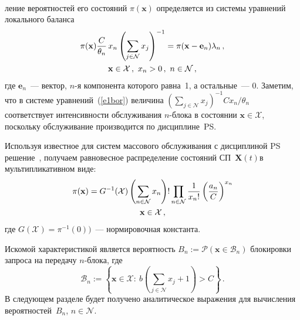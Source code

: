  \begin{figure}[b]  %
\begin{center}
\mbox{%
\epsfxsize=157.777mm
}
\end{center}
\vspace*{-9pt}
\end{figure}

  
\begin{multicols}{2}

\noindent
ление вероятностей его 
состояний $\pi (\mathbf{x})$ определяется из системы уравнений локального 
баланса
\begin{multline}
\pi (\mathbf{x} ) \displaystyle\frac{\displaystyle C\mathstrut}{\displaystyle \theta_n\mathstrut}\, x_n \left ( \sum\limits_{j\in {\mathcal N}}x_j\right )^{-1} 
=\pi (\mathbf{x} -\mathbf{e}_n)\lambda_n\,,\\
\mathbf{x}\in {\mathcal X}\,,\ x_n >0\,, \  n\in {\mathcal N}\,,
\label{e1bor}
\end{multline}
    где $\mathbf{e}_n$~--- вектор, $n$-я компонента которого равна~1, а 
остальные~--- 0. Заметим, что в сис\-те\-ме урав\-не\-ний~(\ref{e1bor}) величина $(\sum\limits_{j\in {\mathcal 
N}} x_j)^{-1} Cx_n/\theta_n$ соответствует интенсивности обслуживания 
  $n$-блока в состоянии $\mathbf{x}\in {\mathcal X}$, поскольку обслуживание 
производится по дисциплине~PS.


  Используя известное для систем массового обслуживания с 
дисциплиной PS решение~\cite{8bor}, получаем равновесное распределение состояний 
СП~$\mathbf{X}(t)$в мультипликативном виде:
  \begin{multline*}
  \pi (\mathbf{x} ) = G^{-1} ({\mathcal X}) \left ( \sum\limits_{n\in {\mathcal N}} x_n\right ) !
  \prod_{n\in {\mathcal N}} \fr{1}{x_n!} \left ( \fr{a_n}{C}\right )^{x_n}\\ %
\mathbf{x}\in {\mathcal X}\,,
  \end{multline*} %
  где $G({\mathcal X}) =\pi^{-1}(0))$~--- нормировочная константа.
  
  Искомой характеристикой является вероятность $B_n := {\mathcal P}(\mathbf{x}\in 
{\mathcal B}_n)$ блокировки запроса на передачу $n$-блока, где 
$${\mathcal B}_n := 
  \left\{ \mathbf{x}\in {\mathcal X}:\ b\left ( \sum\limits_{j\in{\mathcal N}} x_j+1\right ) >C\right\}\,.
  $$
   В следующем разделе будет получено аналитическое выражения для вычисления 
вероятностей~$B_n$, $n\in {\mathcal N}$.


\end{multicols}
